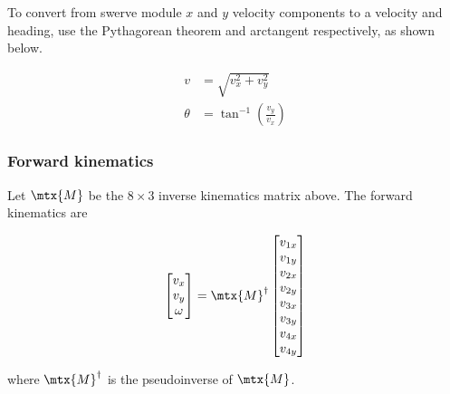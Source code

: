 To convert from swerve module $x$ and $y$ velocity components to a velocity and
heading, use the Pythagorean theorem and arctangent respectively, as shown
below.

\begin{align}
  v &= \sqrt{v_x^2 + v_y^2} \\
  \theta &= \tan^{-1}\left(\frac{v_y}{v_x}\right)
\end{align}

\subsubsection{Forward kinematics}

Let $\mtx{M}$ be the $8 \times 3$ inverse kinematics matrix above. The forward
kinematics are

\begin{equation}
  \begin{bmatrix}
    v_x \\
    v_y \\
    \omega
  \end{bmatrix} =
  \mtx{M}^\dagger
  \begin{bmatrix}
    v_{1x} \\
    v_{1y} \\
    v_{2x} \\
    v_{2y} \\
    v_{3x} \\
    v_{3y} \\
    v_{4x} \\
    v_{4y}
  \end{bmatrix}
\end{equation}

where $\mtx{M}^\dagger$ is the pseudoinverse of $\mtx{M}$.
